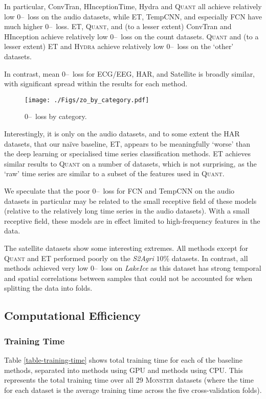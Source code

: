 \documentclass[twoside,11pt,preprint]{article}
\newcommand{\monster}{\textsc{Monster}}
\newcommand{\zo}{\mbox{0--\!1}~loss}
\newcommand{\quant}{\textsc{Quant}}
\newcommand{\hydra}{\textsc{Hydra}}
\begin{document}
In particular, ConvTran, HInceptionTime, Hydra and {\quant} all achieve relatively low {\zo} on the audio datasets, while ET, TempCNN, and especially FCN have much higher {\zo}. ET, {\quant}, and (to a lesser extent) ConvTran and HInception achieve relatively low {\zo} on the count datasets. {\quant} and (to a lesser extent) ET and {\hydra} achieve relatively low {\zo} on the `other' datasets.

In contrast, mean {\zo} for ECG/EEG, HAR, and Satellite is broadly similar, with significant spread within the results for each method.

\begin{figure}%
    \centering%
    \texttt{[image: ./Figs/zo\_by\_category.pdf]}%
    \caption{{\zo} by category.}%
    \label{fig-by-category}%
\end{figure}%

Interestingly, it is only on the audio datasets, and to some extent the HAR datasets, that our na\"{i}ve baseline, ET, appears to be meaningfully `worse' than the deep learning or specialised time series classification methods. ET achieves similar results to {\quant} on a number of datasets, which is not surprising, as the `raw' time series are similar to a subset of the features used in {\quant}.

We speculate that the poor {\zo} for FCN and TempCNN on the audio datasets in particular may be related to the small receptive field of these models (relative to the relatively long time series in the audio datasets). With a small receptive field, these models are in effect limited to high-frequency features in the data.

The satellite datasets show some interesting extremes. All methods except for {\quant} and ET performed poorly on the \textit{S2Agri} $10\%$ datasets. In contrast, all methods achieved very low {\zo} on \textit{LakeIce} as this dataset has strong temporal and spatial correlations between samples that could not be accounted for when splitting the data into folds.

\subsection{Computational Efficiency}

\subsubsection{Training Time}

Table \ref{table-training-time} shows total training time for each of the baseline methods, separated into methods using GPU and methods using CPU. This represents the total training time over all 29  {\monster} datasets (where the time for each dataset is the average training time across the five cross-validation folds). 
\end{document}
